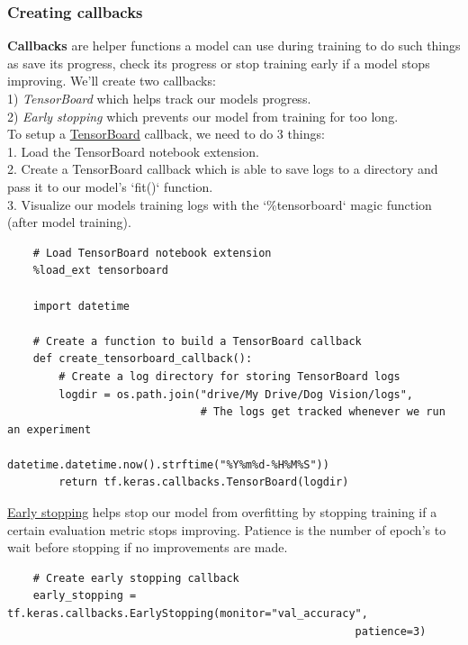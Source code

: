 \documentclass[11pt, a4paper]{article}
\begin{document}
\begin{spacing}{1.1}
	\subsubsection{Creating callbacks} 
	\textbf{Callbacks} are helper functions a model can use during training to do such things as save its progress, check its progress or stop training early if a model stops improving. We'll create two callbacks: \\
	\hspace*{2mm} 1) \textit{TensorBoard} which helps track our models progress. \\
	\hspace*{2mm} 2) \textit{Early stopping} which prevents our model from training for too long. \vspace*{1.5mm} \\
	To setup a \href{https://www.tensorflow.org/api_docs/python/tf/keras/callbacks/TensorBoard}{TensorBoard} callback, we need to do 3 things: \\
	1. Load the TensorBoard notebook extension. \\
	2. Create a TensorBoard callback which is able to save logs to a directory and pass it to our model's \hspace*{3mm} `fit()` function. \\
	3. Visualize our models training logs with the `\%tensorboard` magic function (after model training).
	\begin{lstlisting}
	# Load TensorBoard notebook extension
	%load_ext tensorboard
	
	import datetime
	
	# Create a function to build a TensorBoard callback
	def create_tensorboard_callback():
		# Create a log directory for storing TensorBoard logs
		logdir = os.path.join("drive/My Drive/Dog Vision/logs",
		                      # The logs get tracked whenever we run an experiment
		                      datetime.datetime.now().strftime("%Y%m%d-%H%M%S"))
		return tf.keras.callbacks.TensorBoard(logdir) \end{lstlisting} \vspace*{1mm}
	\href{https://www.tensorflow.org/api_docs/python/tf/keras/callbacks/EarlyStopping}{Early stopping} helps stop our model from overfitting by stopping training if a certain evaluation metric stops improving. Patience is the number of epoch's to wait before stopping if no improvements are made.
	\begin{lstlisting}
	# Create early stopping callback
	early_stopping = tf.keras.callbacks.EarlyStopping(monitor="val_accuracy",
	                                                  patience=3) \end{lstlisting} \newpage


\end{spacing}
\end{document}
